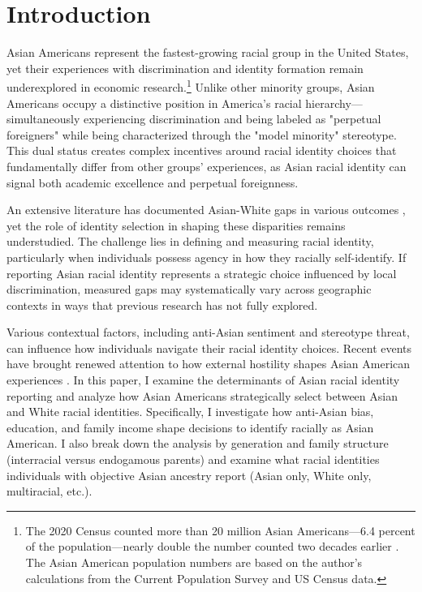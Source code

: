 
\section{Introduction}\label{sec:intro}

Asian Americans represent the fastest-growing racial group in the United States, yet their experiences with discrimination and identity formation remain underexplored in economic research.\footnote{The 2020 Census counted more than 20 million Asian Americans---6.4 percent of the population—nearly double the number counted two decades earlier \autocite{floodsarahIntegratedPublicUse2021a}. The Asian American population numbers are based on the author's calculations from the Current Population Survey and US Census data.} Unlike other minority groups, Asian Americans occupy a distinctive position in America's racial hierarchy—simultaneously experiencing discrimination and being labeled as "perpetual foreigners" while being characterized through the "model minority" stereotype. This dual status creates complex incentives around racial identity choices that fundamentally differ from other groups' experiences, as Asian racial identity can signal both academic excellence and perpetual foreignness.

An extensive literature has documented Asian-White gaps in various outcomes \autocite{chiswick1983analysis, duleep2012economic, hilger2016upward, arabsheibani2010asian}, yet the role of identity selection in shaping these disparities remains understudied. The challenge lies in defining and measuring racial identity, particularly when individuals possess agency in how they racially self-identify. If reporting Asian racial identity represents a strategic choice influenced by local discrimination, measured gaps may systematically vary across geographic contexts in ways that previous research has not fully explored.

Various contextual factors, including anti-Asian sentiment and stereotype threat, can influence how individuals navigate their racial identity choices. Recent events have brought renewed attention to how external hostility shapes Asian American experiences \autocite{gover2020anti}. In this paper, I examine the determinants of Asian racial identity reporting and analyze how Asian Americans strategically select between Asian and White racial identities. Specifically, I investigate how anti-Asian bias, education, and family income shape decisions to identify racially as Asian American. I also break down the analysis by generation and family structure (interracial versus endogamous parents) and examine what racial identities individuals with objective Asian ancestry report (Asian only, White only, multiracial, etc.).

